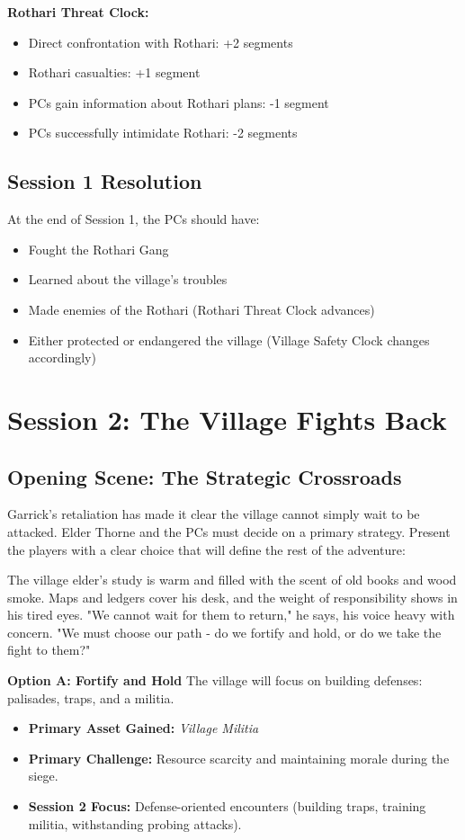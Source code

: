 \documentclass[11pt]{article}
\begin{document}
\textbf{Rothari Threat Clock:}
\begin{itemize}
\item Direct confrontation with Rothari: +2 segments
\item Rothari casualties: +1 segment
\item PCs gain information about Rothari plans: -1 segment
\item PCs successfully intimidate Rothari: -2 segments
\end{itemize}

\subsection{Session 1 Resolution}

At the end of Session 1, the PCs should have:
\begin{itemize}
\item Fought the Rothari Gang
\item Learned about the village's troubles
\item Made enemies of the Rothari (Rothari Threat Clock advances)
\item Either protected or endangered the village (Village Safety Clock changes accordingly)
\end{itemize}

\section{Session 2: The Village Fights Back}

\subsection{Opening Scene: The Strategic Crossroads}

Garrick's retaliation has made it clear the village cannot simply wait to be attacked. Elder Thorne and the PCs must decide on a primary strategy. Present the players with a clear choice that will define the rest of the adventure:

The village elder's study is warm and filled with the scent of old books and wood smoke. Maps and ledgers cover his desk, and the weight of responsibility shows in his tired eyes. "We cannot wait for them to return," he says, his voice heavy with concern. "We must choose our path - do we fortify and hold, or do we take the fight to them?"

\textbf{Option A: Fortify and Hold}
The village will focus on building defenses: palisades, traps, and a militia.
\begin{itemize}
\item \textbf{Primary Asset Gained:} \textit{Village Militia}
\item \textbf{Primary Challenge:} Resource scarcity and maintaining morale during the siege.
\item \textbf{Session 2 Focus:} Defense-oriented encounters (building traps, training militia, withstanding probing attacks).
\end{itemize}
\end{document}
